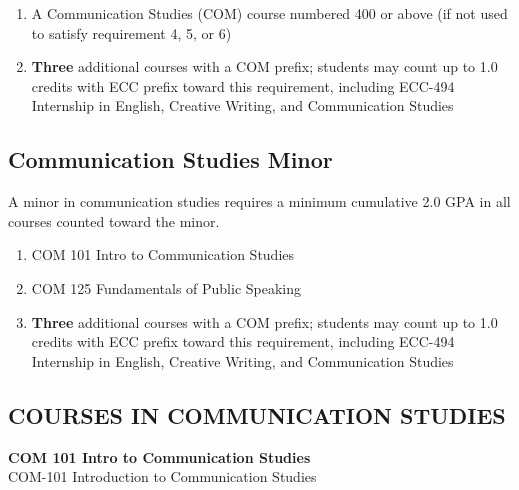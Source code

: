 \documentclass[
  letterpaper,
]{scrbook}
\providecommand{\tightlist}{%
  \setlength{\itemsep}{0pt}\setlength{\parskip}{0pt}}
\begin{document}
\begin{enumerate}
  COM 275/277 Topics in Communication Studies\\
  COM 377 Language, Power, and Social Change\\
  COM 465/467 Special Topics in Public Discourse (WE)
\item
  A Communication Studies (COM) course numbered 400 or above (if not
  used to satisfy requirement 4, 5, or 6)
\item
  \textbf{Three} additional courses with a COM prefix; students may
  count up to 1.0 credits with ECC prefix toward this requirement,
  including ECC-494 Internship in English, Creative Writing, and
  Communication Studies
\end{enumerate}

\subsection{Communication Studies
Minor}\label{communication-studies-minor}

A minor in communication studies requires a minimum cumulative 2.0 GPA
in all courses counted toward the minor.

\begin{enumerate}
\def\labelenumi{\arabic{enumi}.}
\tightlist
\item
  COM 101 Intro to Communication Studies\\
\item
  COM 125 Fundamentals of Public Speaking\\
\item
  \textbf{Three} additional courses with a COM prefix; students may
  count up to 1.0 credits with ECC prefix toward this requirement,
  including ECC-494 Internship in English, Creative Writing, and
  Communication Studies
\end{enumerate}

\subsection{COURSES IN COMMUNICATION
STUDIES}\label{courses-in-communication-studies}

\textbf{COM 101 Intro to Communication Studies}\\
COM-101 Introduction to Communication Studies
\end{document}
